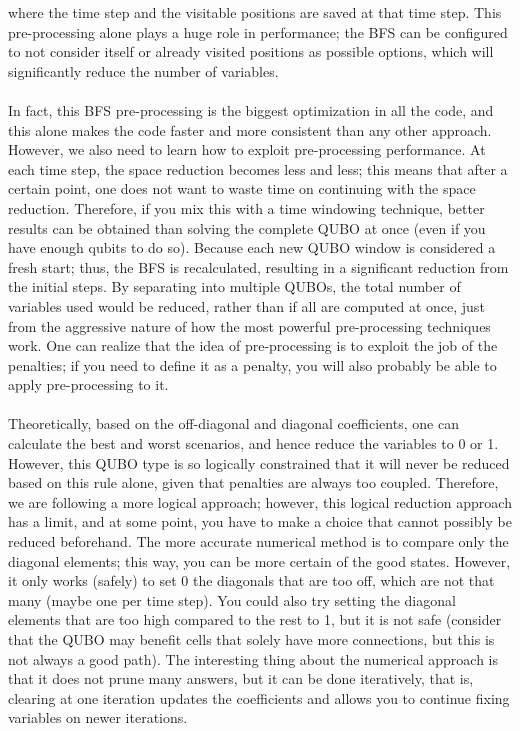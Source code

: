 \documentclass[11pt]{article}
\begin{document}
where the time step and the visitable positions are saved at that time step. This pre-processing alone plays a huge role in performance; the BFS can be configured to not consider itself or already visited positions as possible options, which will significantly reduce the number of variables. \\
\\
In fact, this BFS pre-processing is the biggest optimization in all the code, and this alone makes the code faster and more consistent than any other approach. However, we also need to learn how to exploit pre-processing performance. At each time step, the space reduction becomes less and less; this means that after a certain point, one does not want to waste time on continuing with the space reduction. Therefore, if you mix this with a time windowing technique, better results can be obtained than solving the complete QUBO at once (even if you have enough qubits to do so). Because each new QUBO window is considered a fresh start; thus, the BFS is recalculated, resulting in a significant reduction from the initial steps. By separating into multiple QUBOs, the total number of variables used would be reduced, rather than if all are computed at once, just from the aggressive nature of how the most powerful pre-processing techniques work. One can realize that the idea of pre-processing is to exploit the job of the penalties; if you need to define it as a penalty, you will also probably be able to apply pre-processing to it.\\
\\
Theoretically, based on the off-diagonal and diagonal coefficients, one can calculate the best and worst scenarios, and hence reduce the variables to 0 or 1. However, this QUBO type is so logically constrained that it will never be reduced based on this rule alone, given that penalties are always too coupled. Therefore, we are following a more logical approach; however, this logical reduction approach has a limit, and at some point, you have to make a choice that cannot possibly be reduced beforehand. The more accurate numerical method is to compare only the diagonal elements; this way, you can be more certain of the good states. However, it only works (safely) to set 0 the diagonals that are too off, which are not that many (maybe one per time step). You could also try setting the diagonal elements that are too high compared to the rest to 1, but it is not safe (consider that the QUBO may benefit cells that solely have more connections, but this is not always a good path). The interesting thing about the numerical approach is that it does not prune many answers, but it can be done iteratively, that is, clearing at one iteration updates the coefficients and allows you to continue fixing variables on newer iterations.\\
\end{document}
